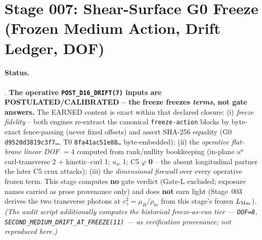 \section{Stage 007: Shear-Surface G0 Freeze (Frozen Medium Action, Drift Ledger, DOF)}

\claimstatus{\StatusExactClosure}

\paragraph{Status.}
\StatusExactClosure. \textbf{The operative \texttt{POST\_D16\_DRIFT(7)} inputs are
POSTULATED/CALIBRATED -- the freeze freezes \emph{terms}, not gate answers.} The
EARNED content is exact within that declared closure: (i) \emph{freeze fidelity}
-- both engines re-extract the canonical \texttt{freeze-action} blocks by
byte-exact fence-parsing (never fixed offsets) and assert SHA-256 equality
(G0 \texttt{d9520d3819c3f7\ldots}, T0 \texttt{8fa41ac51e88\ldots}
byte-embedded); (ii) the \emph{operative flat-brane linear DOF}
\(=4\) computed from rank/nullity bookkeeping (in-plane \(u^a\)
curl-transverse 2 + kinetic--curl 1; \(u_w\) 1; C5 \(\varphi\) \textbf{0} -- the
absent longitudinal partner the later C5 crux attacks); (iii) the
\emph{dimensional firewall} over every operative frozen term. This stage computes
\textbf{no} gate verdict (Gate-L excluded; exposure names carried as prose
provenance only) and does \textbf{not} earn light (Stage~003 derives the two
transverse photons at \(c_\gamma^2=\mu_R/\rho_{br}\) from this stage's frozen
\(L_{\rm Mac}\)). \emph{(The audit script additionally computes the historical
freeze-as-run tier --- \texttt{DOF=8},
\texttt{SECOND\_MEDIUM\_DRIFT\_AT\_FREEZE(11)} --- as verification provenance; not
reproduced here.)}


